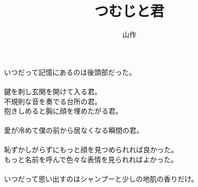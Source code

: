\documentclass[a5j,12pt]{tbook}
\title{つむじと君}
\author{\rensuji{J}山\rensuji{B}作}
\date{}
\begin{document}
\maketitle

いつだって記憶にあるのは後頭部だった。\\
\\
鍵を刺し玄関を開けて入る君。\\
不規則な音を奏でる台所の君。\\
抱きしめると胸に顔を埋めたがる君。\\
\\
愛が冷めて僕の前から居なくなる瞬間の君。\\
\\
恥ずかしがらずにもっと顔を見つめられれば良かった。\\
もっと名前を呼んで色々な表情を見られればよかった。\\
\\
いつだって思い出すのはシャンプーと少しの地肌の香りだけ。
\end{document}
